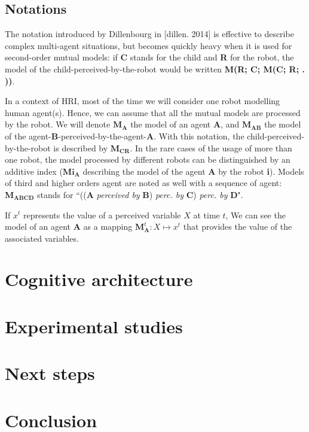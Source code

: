 \documentclass[10pt,a4paper,twocolumn]{article}
\begin{document}
\subsection{Notations}

The notation introduced by Dillenbourg in [dillen. 2014] is effective to describe complex multi-agent situations, but becomes quickly heavy when it is used for second-order mutual models: if \textbf{C} stands for the child and \textbf{R} for the robot, the model of the child-perceived-by-the-robot would be written \textbf{M(R; C; M(C; R; . ))}.

In a context of HRI, most of the time we will consider one robot modelling human agent(s). Hence, we can assume that all the mutual models are processed by the robot. We will denote $\textbf{M}_\textbf{A}$ the model of an agent $\textbf{A}$, and $\textbf{M}_\textbf{AB}$ the model of the agent-\textbf{B}-perceived-by-the-agent-\textbf{A}. With this notation, the child-perceived-by-the-robot is described by $\textbf{M}_\textbf{CR}$. In the rare cases of the usage of more than one robot, the model processed by different robots can be distinguished by an additive index ($\textbf{Mi}_\textbf{A}$ describing the model of the agent \textbf{A} by the robot \textbf{i}). Models of third and higher orders agent are noted as well with a sequence of agent: $\textbf{M}_\textbf{ABCD}$ stands for ``((\textbf{A} \textit{perceived by} \textbf{B}) \textit{perc. by} \textbf{C}) \textit{perc. by} \textbf{D}".

If $x^t$ represents the value of a perceived variable $X$ at time $t$, We can see the model of an agent \textbf{A} as a mapping $\textbf{M}^t_\textbf{A}: X \mapsto x^t$ that provides the value of the associated variables. 








\section{Cognitive architecture}

\section{Experimental studies}

\section{Next steps}

\section{Conclusion}





 
\end{document}
